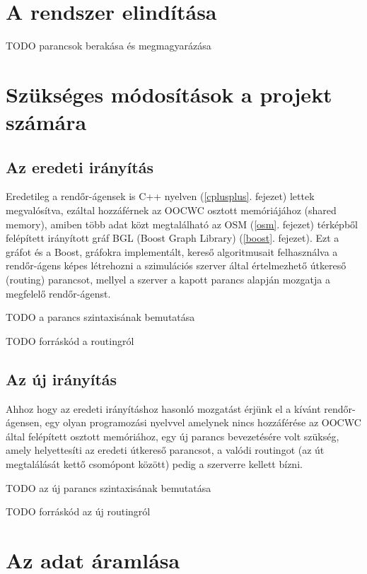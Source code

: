 \documentclass[a4paper,12pt]{report}
\begin{document}
\section{A rendszer elindítása}
\label{howtostart}

TODO parancsok berakása és megmagyarázása

\section{Szükséges módosítások a projekt számára}
\label{changes}

\subsection{Az eredeti irányítás}
\label{originalrouting}
Eredetileg a rendőr-ágensek is C++ nyelven (\ref{cplusplus}. fejezet) lettek megvalósítva, ezáltal hozzáférnek az OOCWC osztott memóriájához (shared memory), amiben több adat közt megtalálható az OSM \citep{osm} (\ref{osm}. fejezet) térképből felépített irányított gráf BGL (Boost Graph Library) (\ref{boost}. fejezet). Ezt a gráfot és a Boost, gráfokra implementált, kereső algoritmusait felhasználva a rendőr-ágens képes létrehozni a szimulációs szerver által értelmezhető útkereső (routing) parancsot, mellyel a szerver a kapott parancs alapján mozgatja a megfelelő rendőr-ágenst. 

\vspace{2mm}
TODO a parancs szintaxisának bemutatása

TODO forráskód a routingról

\subsection{Az új irányítás}
\label{newrouting}

Ahhoz hogy az eredeti irányításhoz hasonló mozgatást érjünk el a kívánt rendőr-ágensen, egy olyan programozási nyelvvel amelynek nincs hozzáférése az OOCWC által felépített osztott memóriához, egy új parancs bevezetésére volt szükség, amely helyettesíti az eredeti útkereső parancsot, a valódi routingot (az út megtalálását kettő csomópont között) pedig a szerverre kellett bízni.

\vspace{2mm}
TODO az új parancs szintaxisának bemutatása

TODO forráskód az új routingról

\section{Az adat áramlása}
\label{dataflow}
\end{document}
